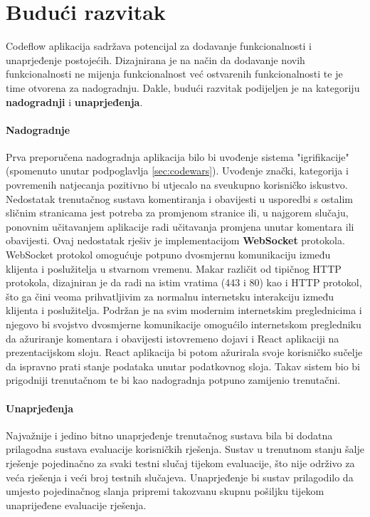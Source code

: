 \documentclass[times, utf8, zavrsni]{fer}
\begin{document}
	\chapter{Budući razvitak}
	Codeflow aplikacija sadržava potencijal za dodavanje funkcionalnosti i unaprjeđenje postojećih. Dizajnirana je na način da dodavanje novih funkcionalnosti ne mijenja funkcionalnost već ostvarenih funkcionalnosti te je time otvorena za nadogradnju. Dakle, budući razvitak podijeljen je na kategoriju \textbf{nadogradnji} i \textbf{unaprjeđenja}.
	\subsubsection{Nadogradnje}
	Prva preporučena nadogradnja aplikacija bilo bi uvođenje sistema "igrifikacije" (spomenuto unutar podpoglavlja \ref{sec:codewars}). Uvođenje znački, kategorija i povremenih natjecanja pozitivno bi utjecalo na sveukupno korisničko iskustvo.\\
	Nedostatak trenutačnog sustava komentiranja i obavijesti u usporedbi s ostalim sličnim stranicama jest potreba za promjenom stranice ili, u najgorem slučaju, ponovnim učitavanjem aplikacije radi učitavanja promjena unutar komentara ili obavijesti. Ovaj nedostatak rješiv je implementacijom \textbf{WebSocket} protokola. WebSocket protokol omogućuje potpuno dvosmjernu komunikaciju između klijenta i poslužitelja u stvarnom vremenu. Makar različit od tipičnog HTTP protokola, dizajniran je da radi na istim vratima  (443 i 80) kao i HTTP protokol, što ga čini veoma prihvatljivim za normalnu internetsku interakciju između klijenta i poslužitelja. Podržan je na svim modernim internetskim preglednicima i njegovo bi svojstvo dvosmjerne komunikacije omogućilo internetskom pregledniku da ažuriranje komentara i obavijesti istovremeno dojavi i React aplikaciji na prezentacijskom sloju. React aplikacija bi potom ažurirala svoje korisničko sučelje da ispravno prati stanje podataka unutar podatkovnog sloja. Takav sistem bio bi prigodniji trenutačnom te bi kao nadogradnja potpuno zamijenio trenutačni.
	\subsubsection{Unaprjeđenja}
	Najvažnije i jedino bitno unaprjeđenje trenutačnog sustava bila bi dodatna prilagodna sustava evaluacije korisničkih rješenja. Sustav u trenutnom stanju šalje rješenje pojedinačno za svaki testni slučaj tijekom evaluacije, što nije održivo za veća rješenja i veći broj testnih slučajeva. Unaprjeđenje bi sustav prilagodilo da umjesto pojedinačnog slanja pripremi takozvanu skupnu  pošiljku tijekom unaprijeđene evaluacije rješenja. 
	
\end{document}
